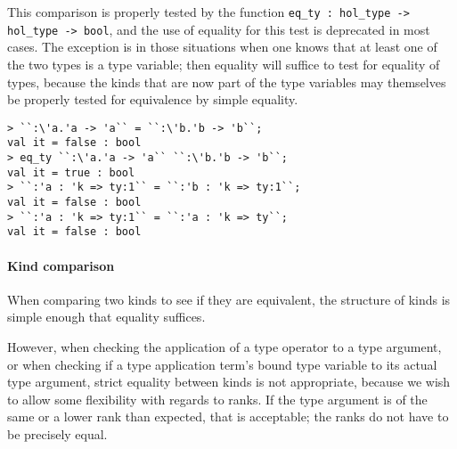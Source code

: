 This comparison is properly tested by the \ML{} function
\texttt{eq\_ty~{:}~hol\_type -> hol\_type -> bool}, and the use of
\ML{} equality for this test is deprecated in most cases.
The exception is in those situations when one knows that at least one
of the two types is a type variable;
then \ML{} equality will suffice to test for equality of types, because the
kinds that are now part of the type variables may themselves be properly
tested for equivalence by simple \ML{} equality.
%
\begin{session}
\begin{verbatim}
> ``:\'a.'a -> 'a`` = ``:\'b.'b -> 'b``;
val it = false : bool
> eq_ty ``:\'a.'a -> 'a`` ``:\'b.'b -> 'b``;
val it = true : bool
> ``:'a : 'k => ty:1`` = ``:'b : 'k => ty:1``;
val it = false : bool
> ``:'a : 'k => ty:1`` = ``:'a : 'k => ty``;
val it = false : bool
\end{verbatim}
\end{session}



\paragraph{Kind comparison}

When comparing two kinds to see if they are equivalent, the structure
of kinds is simple enough that \ML{} equality suffices.

However, when checking the application of a type operator to a type argument,
or when checking if a type application term's bound type variable to its
actual type argument, strict \ML{} equality between kinds is not appropriate,
because we wish to allow some flexibility with regards to ranks.
If the type argument is of the same or a lower rank than expected,
that is acceptable; the ranks do not have to be precisely equal.

